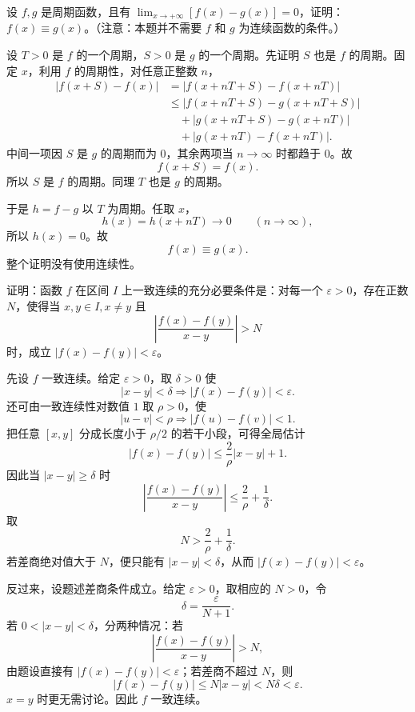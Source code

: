 \begin{xreferenceproblem}[14]
设 $f,g$ 是周期函数，且有 $\lim_{x\to+\infty}[f(x)-g(x)]=0$，证明：$f(x)\equiv g(x)$。（注意：本题并不需要 $f$ 和 $g$ 为连续函数的条件。）
\end{xreferenceproblem}
\begin{xsolution}
设 $T>0$ 是 $f$ 的一个周期，$S>0$ 是 $g$ 的一个周期。先证明 $S$ 也是 $f$ 的周期。固定 $x$，利用 $f$ 的周期性，对任意正整数 $n$，
\[
 \begin{aligned}
 |f(x+S)-f(x)|
 &=|f(x+nT+S)-f(x+nT)|\\
 &\le |f(x+nT+S)-g(x+nT+S)|\\
 &\quad+|g(x+nT+S)-g(x+nT)|\\
 &\quad+|g(x+nT)-f(x+nT)|.
 \end{aligned}
\]
中间一项因 $S$ 是 $g$ 的周期而为 $0$，其余两项当 $n\to\infty$ 时都趋于 $0$。故
\[
 f(x+S)=f(x).
\]
所以 $S$ 是 $f$ 的周期。同理 $T$ 也是 $g$ 的周期。

于是 $h=f-g$ 以 $T$ 为周期。任取 $x$，
\[
 h(x)=h(x+nT)\to0
 \qquad(n\to\infty),
\]
所以 $h(x)=0$。故
\[
 f(x)\equiv g(x).
\]
整个证明没有使用连续性。
\end{xsolution}


\begin{xreferenceproblem}[15]
证明：函数 $f$ 在区间 $I$ 上一致连续的充分必要条件是：对每一个 $\varepsilon>0$，存在正数 $N$，使得当 $x,y\in I,x\ne y$ 且
  \[
    \left|\frac{f(x)-f(y)}{x-y}\right|>N
  \]
  时，成立 $|f(x)-f(y)|<\varepsilon$。
\end{xreferenceproblem}
\begin{xsolution}
先设 $f$ 一致连续。给定 $\varepsilon>0$，取 $\delta>0$ 使
\[
 |x-y|<\delta\Longrightarrow |f(x)-f(y)|<\varepsilon.
\]
还可由一致连续性对数值 $1$ 取 $\rho>0$，使
\[
 |u-v|<\rho\Longrightarrow |f(u)-f(v)|<1.
\]
把任意 $[x,y]$ 分成长度小于 $\rho/2$ 的若干小段，可得全局估计
\[
 |f(x)-f(y)|
 \le \frac{2}{\rho}|x-y|+1.
\]
因此当 $|x-y|\ge\delta$ 时
\[
 \left|\frac{f(x)-f(y)}{x-y}\right|
 \le\frac2\rho+\frac1\delta.
\]
取
\[
 N>\frac2\rho+\frac1\delta.
\]
若差商绝对值大于 $N$，便只能有 $|x-y|<\delta$，从而 $|f(x)-f(y)|<\varepsilon$。

反过来，设题述差商条件成立。给定 $\varepsilon>0$，取相应的 $N>0$，令
\[
 \delta=\frac\varepsilon{N+1}.
\]
若 $0<|x-y|<\delta$，分两种情况：若
\[
 \left|\frac{f(x)-f(y)}{x-y}\right|>N,
\]
由题设直接有 $|f(x)-f(y)|<\varepsilon$；若差商不超过 $N$，则
\[
 |f(x)-f(y)|\le N|x-y|<N\delta<\varepsilon.
\]
$x=y$ 时更无需讨论。因此 $f$ 一致连续。
\end{xsolution}


